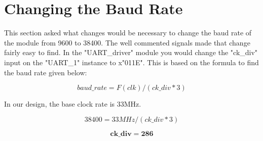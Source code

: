 \documentclass{article}
\begin{document}
\section{Changing the Baud Rate}
This section asked what changes would be necessary to change the baud rate of the module from 9600 to 38400. The well commented signals made that change fairly easy to find. In the "UART\_driver" module you would change the "ck\_div" input on the "UART\_1" instance to x"011E". This is based on the formula to find the baud rate given below:

	\begin{displaymath}
		baud\_rate = F(clk) / (ck\_div*3)
	\end{displaymath}

In our design, the base clock rate is 33MHz.

	\begin{displaymath}
		38400 = 33MHz / (ck\_div*3)
	\end{displaymath}
	
	\begin{displaymath}
		\boldsymbol{ck\_div = 286}
	\end{displaymath}








 
\end{document}

